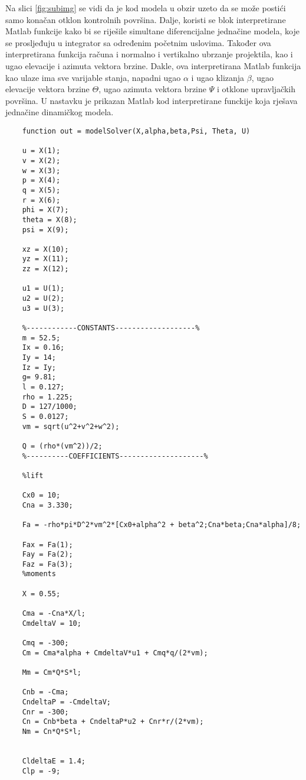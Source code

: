 Na slici \ref{fig:subimg} se vidi da je kod modela u obzir uzeto da se može postići samo 
konačan otklon kontrolnih površina. Dalje, koristi se blok interpretirane Matlab funkcije 
kako bi se riješile simultane diferencijalne jednačine modela, koje se prosljeđuju 
u integrator sa određenim početnim uslovima. Također ova interpretirana funkcija računa 
i normalno i vertikalno ubrzanje projektila, kao i ugao elevacije i azimuta vektora brzine. Dakle,
ova interpretirana Matlab funkcija kao ulaze ima sve varijable stanja, napadni ugao $\alpha$ i ugao klizanja $\beta$, 
ugao elevacije vektora brzine $\Theta$, ugao azimuta vektora brzine $\Psi$ i otklone 
upravljačkih površina. U nastavku je prikazan Matlab kod interpretirane funckije koja 
rješava jednačine dinamičkog modela. 
\begin{lstlisting}
    function out = modelSolver(X,alpha,beta,Psi, Theta, U)
    
    u = X(1);
    v = X(2);
    w = X(3);
    p = X(4);
    q = X(5);
    r = X(6);
    phi = X(7);
    theta = X(8);
    psi = X(9);
    
    xz = X(10);
    yz = X(11);
    zz = X(12);
    
    u1 = U(1);
    u2 = U(2);
    u3 = U(3);
    
    %------------CONSTANTS-------------------%
    m = 52.5;
    Ix = 0.16;
    Iy = 14;
    Iz = Iy;
    g= 9.81;
    l = 0.127;
    rho = 1.225;
    D = 127/1000;
    S = 0.0127;
    vm = sqrt(u^2+v^2+w^2);
    
    Q = (rho*(vm^2))/2;
    %----------COEFFICIENTS--------------------%
    
    %lift
    
    Cx0 = 10;
    Cna = 3.330;
    
    Fa = -rho*pi*D^2*vm^2*[Cx0+alpha^2 + beta^2;Cna*beta;Cna*alpha]/8;
    
    Fax = Fa(1);
    Fay = Fa(2);
    Faz = Fa(3);
    %moments
    
    X = 0.55;
    
    Cma = -Cna*X/l;
    CmdeltaV = 10;
    
    Cmq = -300;
    Cm = Cma*alpha + CmdeltaV*u1 + Cmq*q/(2*vm);
    
    Mm = Cm*Q*S*l;
    
    Cnb = -Cma;
    CndeltaP = -CmdeltaV;
    Cnr = -300;
    Cn = Cnb*beta + CndeltaP*u2 + Cnr*r/(2*vm);
    Nm = Cn*Q*S*l;
    
    
    CldeltaE = 1.4;
    Clp = -9;
    

\end{lstlisting}
